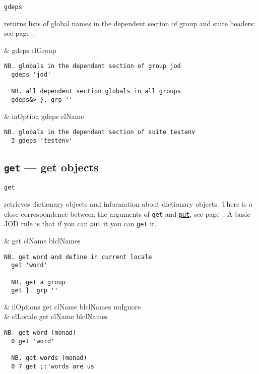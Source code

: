 \hypertarget{il:gdeps}{\texttt{gdeps}} returns lists of global names 
in the dependent section of group and suite headers: see page~\pageref{ss:depsec}.

\begin{wordhead}
\monad & gdeps clGroup \\
\end{wordhead}
\begin{lstlisting}[frame=single,framerule=0pt]
  NB. globals in the dependent section of group jod
  gdeps 'jod'  
  
  NB. all dependent section globals in all groups
  gdeps&> }. grp ''
\end{lstlisting}

\begin{wordhead}
\dyad & iaOption gdeps clName \\
\end{wordhead}
\begin{lstlisting}[frame=single,framerule=0pt]
  NB. globals in the dependent section of suite testenv
  3 gdeps 'testenv'  
\end{lstlisting}

\subsection{\texttt{get} --- get objects}\label{ss:get}

\hypertarget{il:get}{\texttt{get}} retrieves dictionary objects and information 
about dictionary objects. 
There is a close correspondence between the arguments of \texttt{get} 
and \hyperlink{il:put}{\texttt{put}}, see page~\pageref{ss:put}. 
A basic JOD rule is that if you can \texttt{put} it you can \texttt{get} it.

\begin{wordhead}
\monad & get clName \argsep blclNames \\
\end{wordhead}
\begin{lstlisting}[frame=single,framerule=0pt]
  NB. get word and define in current locale
  get 'word'  
  
  NB. get a group  
  get }. grp '' 
\end{lstlisting}

\begin{wordhead}
\dyad & ilOptions get clName \argsep blclNames \argsep uuIgnore \\
      & clLocale get clName \argsep blclNames \\
\end{wordhead}
\begin{lstlisting}[frame=single,framerule=0pt]
  NB. get word (monad)
  0 get 'word'  
  
  NB. get words (monad) 
  0 7 get ;:'words are us' 
\end{lstlisting} 

